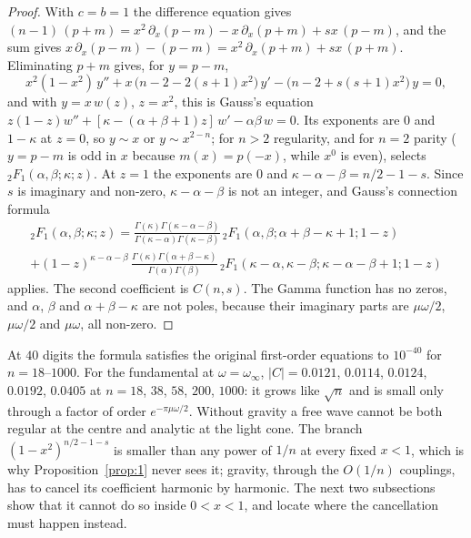\documentclass{amsart}
\numberwithin{equation}{section}
\theoremstyle{plain}
\theoremstyle{definition}
\theoremstyle{remark}
\newcommand{\winf}{\omega_\infty}
\begin{document}
\begin{proof}
With $c = b = 1$ the difference equation gives $(n - 1)\,(p+m) = x^2\,\partial_x(p-m) - x\,\partial_x(p+m) + sx\,(p-m)$,
and the sum gives $x\,\partial_x(p-m) - (p-m) = x^2\,\partial_x(p+m) + sx\,(p+m)$. Eliminating $p + m$ gives, for
$y = p - m$,
\[
x^2(1-x^2)\,y'' + x\,\big(n - 2 - 2(s+1)x^2\big)\,y' - \big(n - 2 + s(s+1)x^2\big)\,y = 0 ,
\]
and with $y = x\,w(z)$, $z = x^2$, this is Gauss's equation $z(1-z)w'' + [\kappa - (\alpha+\beta+1)z]\,w' - \alpha\beta\,w = 0$.
Its exponents are $0$ and $1-\kappa$ at $z = 0$, so $y \sim x$ or $y \sim x^{2-n}$; for $n > 2$ regularity, and for $n = 2$
parity ($y = p - m$ is odd in $x$ because $m(x) = p(-x)$, while $x^0$ is even), selects ${}_2F_1(\alpha,\beta;\kappa;z)$.
At $z = 1$ the exponents are $0$ and $\kappa - \alpha - \beta = n/2 - 1 - s$. Since $s$ is imaginary and non-zero,
$\kappa - \alpha - \beta$ is not an integer, and Gauss's connection formula~\cite[Eq.~15.8.4]{DLMF}
\begin{multline*}
{}_2F_1(\alpha,\beta;\kappa;z) = \frac{\Gamma(\kappa)\Gamma(\kappa-\alpha-\beta)}{\Gamma(\kappa-\alpha)\Gamma(\kappa-\beta)}\,{}_2F_1(\alpha,\beta;\alpha+\beta-\kappa+1;1-z)\\
+ (1-z)^{\kappa-\alpha-\beta}\,\frac{\Gamma(\kappa)\Gamma(\alpha+\beta-\kappa)}{\Gamma(\alpha)\Gamma(\beta)}\,{}_2F_1(\kappa-\alpha,\kappa-\beta;\kappa-\alpha-\beta+1;1-z)
\end{multline*}
applies. The second coefficient is $C(n,s)$. The Gamma function has no zeros, and $\alpha$, $\beta$ and
$\alpha + \beta - \kappa$ are not poles, because their imaginary parts are $\mu\omega/2$, $\mu\omega/2$ and $\mu\omega$,
all non-zero.
\end{proof}

At $40$ digits the formula satisfies the original first-order equations to $10^{-40}$ for $n = 18$--$1000$. For the
fundamental at $\omega = \winf$, $|C| = 0.0121$, $0.0114$, $0.0124$, $0.0192$, $0.0405$ at $n = 18$, $38$, $58$, $200$,
$1000$: it grows like $\sqrt n$ and is small only through a factor of order $e^{-\pi\mu\omega/2}$. Without gravity a
free wave cannot be both regular at the centre and analytic at the light cone. The branch $(1-x^2)^{n/2-1-s}$ is smaller
than any power of $1/n$ at every fixed $x < 1$, which is why Proposition~\ref{prop:1} never sees it; gravity, through
the $O(1/n)$ couplings, has to cancel its coefficient harmonic by harmonic. The next two subsections show that it cannot
do so inside $0 < x < 1$, and locate where the cancellation must happen instead.
\end{document}
